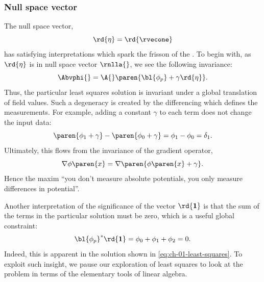 \subsubsection{Null space vector} 
The null space vector,
%
\begin{equation}
	\rd{\eta} = \rd{\rvecone}
\end{equation}
%
has satisfying interpretations which spark the frisson of the \ftola. To begin with, as $\rd{\eta}$ is in null space vector $\rnlla{}$, we see the following invariance:
%
\begin{equation}
	\Abvphi{} = \A{} \paren{\bl{\phi_{p}} + \gamma \rd{\eta} }.
\end{equation}
%
Thus, the particular least squares solution is invariant under a global translation of field values. Such a degeneracy is created by the differencing which defines the measurements. For example, adding a constant $\gamma$ to each term does not change the input data:
\begin{equation}
	\paren{\phi_{1} + \gamma} - \paren{\phi_{0} + \gamma} 
	= \phi_{1} - \phi_{0} 
	= \delta_{1}.
\end{equation}
%
Ultimately, this flows from the invariance of the gradient operator,
%
\begin{equation}
	\nabla \phi \paren{x} = \nabla \paren{ \phi \paren{x} + \gamma}.
\end{equation}
%
Hence the maxim ``you don't measure absolute potentials, you only measure differences in potential''.

Another interpretation of the significance of the vector $\rd{\bf{1}}$ is that the sum of the terms in the particular solution must be zero, which is a useful global constraint:
%
\begin{equation}
	\bl{\phi_{p}}^{*} \rd{\bf{1}} = \phi_{0} + \phi_{1} + \phi_{2} = 0.
\label{eq:ch-01:global constraint}
\end{equation}
% 
Indeed, this is apparent in the solution shown in \eqref{eq:ch-01-least-squares}. To exploit such insight, 
we pause our exploration of least squares to look at the problem in terms of the elementary tools of linear algebra.


